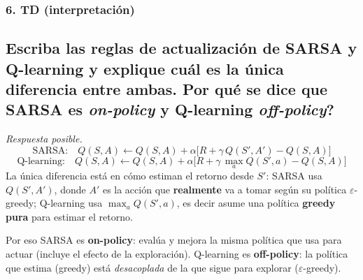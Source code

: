 \documentclass[11pt, a4paper]{article}
\newcommand{\pregunta}[1]{\subsection{#1}}
\newcommand{\eje}[1]{\subsubsection{#1}}
\begin{document}
\eje{6. TD (interpretaci\'on)}
\pregunta{Escriba las reglas de actualizaci\'on de \textbf{SARSA} y \textbf{Q-learning} y explique cu\'al es la \'unica diferencia entre ambas. \textquestiondown Por qu\'e se dice que SARSA es \emph{on-policy} y Q-learning \emph{off-policy}?}

\begin{respuesta}
\textit{Respuesta posible.}
\[
\text{SARSA:}\quad Q(S,A)\leftarrow Q(S,A)+\alpha\big[R+\gamma\,Q(S',A')-Q(S,A)\big]
\]
\[
\text{Q-learning:}\quad Q(S,A)\leftarrow Q(S,A)+\alpha\big[R+\gamma\,\max_a Q(S',a)-Q(S,A)\big]
\]
La \'unica diferencia est\'a en c\'omo estiman el retorno desde $S'$: SARSA usa $Q(S',A')$, donde $A'$ es la acci\'on que \textbf{realmente} va a tomar seg\'un su pol\'itica $\varepsilon$-greedy; Q-learning usa $\max_a Q(S',a)$, es decir asume una pol\'itica \textbf{greedy pura} para estimar el retorno.

Por eso SARSA es \textbf{on-policy}: eval\'ua y mejora la misma pol\'itica que usa para actuar (incluye el efecto de la exploraci\'on). Q-learning es \textbf{off-policy}: la pol\'itica que estima (greedy) est\'a \emph{desacoplada} de la que sigue para explorar ($\varepsilon$-greedy).
\end{respuesta}
\end{document}
